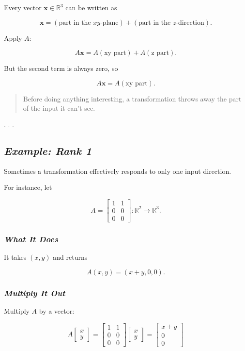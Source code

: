 \documentclass[
  letterpaper,
  DIV=11,
  numbers=noendperiod]{scrartcl}
\begin{document}
Every vector \(\mathbf{x} \in \mathbb{R}^3\) can be written as

\[
\mathbf{x} = (\text{part in the }xy\text{-plane}) + (\text{part in the }z\text{-direction}).
\]

Apply \(A\):

\[
A\mathbf{x} = A(\text{xy part}) + A(\text{z part}).
\]

But the second term is always zero, so

\[
A\mathbf{x} = A(\text{xy part}).
\]

\begin{quote}
Before doing anything interesting, a transformation throws away the part
of the input it can't see.
\end{quote}

. . .

\subsection{\texorpdfstring{\emph{Example: Rank
1}}{Example: Rank 1}}\label{example-rank-1}

Sometimes a transformation effectively responds to only one input
direction.

For instance, let

\[
A =
\begin{bmatrix}
1 & 1 \\
0 & 0 \\
0 & 0
\end{bmatrix}
: \mathbb{R}^2 \to \mathbb{R}^3.
\]

\subsubsection{\texorpdfstring{\emph{What It
Does}}{What It Does}}\label{what-it-does}

It takes \((x,y)\) and returns

\[
A(x,y) = (x+y,0,0).
\]

\subsubsection{\texorpdfstring{\emph{Multiply It
Out}}{Multiply It Out}}\label{multiply-it-out}

Multiply \(A\) by a vector:

\[
A
\begin{bmatrix}
x \\
y
\end{bmatrix}
=
\begin{bmatrix}
1 & 1 \\
0 & 0 \\
0 & 0
\end{bmatrix}
\begin{bmatrix}
x \\
y
\end{bmatrix}
=
\begin{bmatrix}
x + y \\
0 \\
0
\end{bmatrix}
\]
\end{document}
